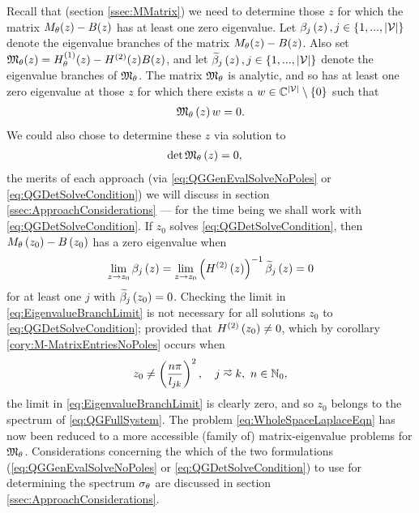 Recall that (section \ref{ssec:MMatrix}) we need to determine those $z$ for which the matrix $M_\theta(z)-B(z)$ has at least one zero eigenvalue.
Let $\beta_j\left( z \right), j\in\left\{ 1,...,\left\lvert \mathcal{V} \right\rvert \right\}$ denote the eigenvalue branches of the matrix $M_\theta(z)-B(z)$.
Also set $\mathfrak{M}_\theta(z) = H^{(1)}_\theta(z) - H^{(2)}(z)B(z)$, and let $\widetilde{\beta}_j\left( z \right), j\in\left\{ 1,...,\left\lvert \mathcal{V} \right\rvert \right\}$ denote the eigenvalue branches of $\mathfrak{M}_\theta$.
The matrix $\mathfrak{M}_\theta$ is analytic, and so has at least one zero eigenvalue at those $z$ for which there exists a $w\in\mathbb{C}^{\left\lvert \mathcal{V} \right\rvert}\setminus\left\{ 0 \right\}$ such that
\begin{align} \label{eq:QGGenEvalSolveNoPoles}
	\mathfrak{M}_\theta\left( z \right)w = 0.
\end{align}
We could also chose to determine these $z$ via solution to 
\begin{align} \label{eq:QGDetSolveCondition}
	\det\mathfrak{M}_\theta\left( z \right) &= 0,
\end{align}
the merits of each approach (via \eqref{eq:QGGenEvalSolveNoPoles} or \eqref{eq:QGDetSolveCondition}) we will discuss in section \ref{ssec:ApproachConsiderations} --- for the time being we shall work with \eqref{eq:QGDetSolveCondition}.
If $z_0$ solves \eqref{eq:QGDetSolveCondition}, then $M_{\theta}\left( z_0 \right)-B\left( z_0 \right)$ has a zero eigenvalue when
\begin{align} \label{eq:EigenvalueBranchLimit}
	\lim_{z\rightarrow z_0} \beta_j\left( z \right) = \lim_{z\rightarrow z_0} \left(  H^{(2)}\left( z \right)  \right)^{-1} \widetilde{\beta}_j\left( z \right) = 0
\end{align}
for at least one $j$ with $\widetilde{\beta}_j\left( z_0 \right)=0$.
Checking the limit in \eqref{eq:EigenvalueBranchLimit} is not necessary for all solutions $z_0$ to \eqref{eq:QGDetSolveCondition}; provided that $H^{(2)}\left( z_0 \right)\neq 0$, which by corollary \ref{cory:M-MatrixEntriesNoPoles} occurs when
\begin{align*}
	z_0 \neq \bracs{ \frac{n\pi}{l_{jk}} }^2, \quad j\conLeft k, \ n\in\naturals_{0},
\end{align*}
the limit in \eqref{eq:EigenvalueBranchLimit} is clearly zero, and so $z_0$ belongs to the spectrum of \eqref{eq:QGFullSystem}.
The problem \eqref{eq:WholeSpaceLaplaceEqn} has now been reduced to a more accessible (family of) matrix-eigenvalue problems for $\mathfrak{M}_\theta$.
Considerations concerning the which of the two formulations (\eqref{eq:QGGenEvalSolveNoPoles} or \eqref{eq:QGDetSolveCondition}) to use for determining the spectrum $\sigma_\theta$ are discussed in section \ref{ssec:ApproachConsiderations}.

